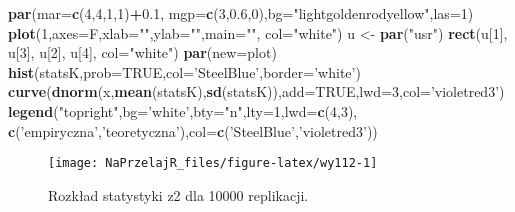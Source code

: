\documentclass[polish,]{book}
\newenvironment{Shaded}{\begin{snugshade}}{\end{snugshade}}
\newcommand{\DataTypeTok}[1]{\textcolor[rgb]{0.13,0.29,0.53}{#1}}
\newcommand{\DecValTok}[1]{\textcolor[rgb]{0.00,0.00,0.81}{#1}}
\newcommand{\FloatTok}[1]{\textcolor[rgb]{0.00,0.00,0.81}{#1}}
\newcommand{\KeywordTok}[1]{\textcolor[rgb]{0.13,0.29,0.53}{\textbf{#1}}}
\newcommand{\NormalTok}[1]{#1}
\newcommand{\OperatorTok}[1]{\textcolor[rgb]{0.81,0.36,0.00}{\textbf{#1}}}
\newcommand{\OtherTok}[1]{\textcolor[rgb]{0.56,0.35,0.01}{#1}}
\newcommand{\StringTok}[1]{\textcolor[rgb]{0.31,0.60,0.02}{#1}}
\begin{document}
\begin{Shaded}
\begin{Highlighting}[]
\KeywordTok{par}\NormalTok{(}\DataTypeTok{mar=}\KeywordTok{c}\NormalTok{(}\DecValTok{4}\NormalTok{,}\DecValTok{4}\NormalTok{,}\DecValTok{1}\NormalTok{,}\DecValTok{1}\NormalTok{)}\OperatorTok{+}\FloatTok{0.1}\NormalTok{, }\DataTypeTok{mgp=}\KeywordTok{c}\NormalTok{(}\DecValTok{3}\NormalTok{,}\FloatTok{0.6}\NormalTok{,}\DecValTok{0}\NormalTok{),}\DataTypeTok{bg=}\StringTok{"lightgoldenrodyellow"}\NormalTok{,}\DataTypeTok{las=}\DecValTok{1}\NormalTok{)}
\KeywordTok{plot}\NormalTok{(}\DecValTok{1}\NormalTok{,}\DataTypeTok{axes=}\NormalTok{F,}\DataTypeTok{xlab=}\StringTok{""}\NormalTok{,}\DataTypeTok{ylab=}\StringTok{""}\NormalTok{,}\DataTypeTok{main=}\StringTok{""}\NormalTok{, }\DataTypeTok{col=}\StringTok{"white"}\NormalTok{)}
\NormalTok{u <-}\StringTok{ }\KeywordTok{par}\NormalTok{(}\StringTok{"usr"}\NormalTok{)}
\KeywordTok{rect}\NormalTok{(u[}\DecValTok{1}\NormalTok{], u[}\DecValTok{3}\NormalTok{], u[}\DecValTok{2}\NormalTok{], u[}\DecValTok{4}\NormalTok{], }\DataTypeTok{col=}\StringTok{"white"}\NormalTok{)}
\KeywordTok{par}\NormalTok{(}\DataTypeTok{new=}\NormalTok{plot)}
\KeywordTok{hist}\NormalTok{(statsK,}\DataTypeTok{prob=}\OtherTok{TRUE}\NormalTok{,}\DataTypeTok{col=}\StringTok{'SteelBlue'}\NormalTok{,}\DataTypeTok{border=}\StringTok{'white'}\NormalTok{)}
\KeywordTok{curve}\NormalTok{(}\KeywordTok{dnorm}\NormalTok{(x,}\KeywordTok{mean}\NormalTok{(statsK),}\KeywordTok{sd}\NormalTok{(statsK)),}\DataTypeTok{add=}\OtherTok{TRUE}\NormalTok{,}\DataTypeTok{lwd=}\DecValTok{3}\NormalTok{,}\DataTypeTok{col=}\StringTok{'violetred3'}\NormalTok{)}
\KeywordTok{legend}\NormalTok{(}\StringTok{"topright"}\NormalTok{,}\DataTypeTok{bg=}\StringTok{'white'}\NormalTok{,}\DataTypeTok{bty=}\StringTok{"n"}\NormalTok{,}\DataTypeTok{lty=}\DecValTok{1}\NormalTok{,}\DataTypeTok{lwd=}\KeywordTok{c}\NormalTok{(}\DecValTok{4}\NormalTok{,}\DecValTok{3}\NormalTok{),}
       \KeywordTok{c}\NormalTok{(}\StringTok{'empiryczna'}\NormalTok{,}\StringTok{'teoretyczna'}\NormalTok{),}\DataTypeTok{col=}\KeywordTok{c}\NormalTok{(}\StringTok{'SteelBlue'}\NormalTok{,}\StringTok{'violetred3'}\NormalTok{))}
\end{Highlighting}
\end{Shaded}

\begin{figure}[h]

{\centering \texttt{[image: NaPrzelajR\_files/figure-latex/wy112-1]} 

}

\caption{Rozkład statystyki z2 dla 10000 replikacji.}\label{fig:wy112}
\end{figure}
\end{document}
